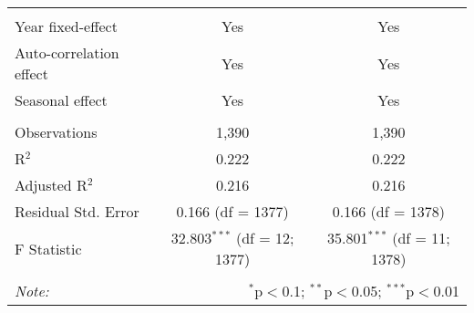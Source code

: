 \begin{table}[!htbp]
\begin{tabular}{@{\extracolsep{5pt}}lcc}
\hline \\[-1.8ex] 
Year fixed-effect & Yes & Yes \\ 
Auto-correlation effect & Yes & Yes \\ 
Seasonal effect & Yes & Yes \\ 
\hline \\[-1.8ex] 
Observations & 1,390 & 1,390 \\ 
R$^{2}$ & 0.222 & 0.222 \\ 
Adjusted R$^{2}$ & 0.216 & 0.216 \\ 
Residual Std. Error & 0.166 (df = 1377) & 0.166 (df = 1378) \\ 
F Statistic & 32.803$^{***}$ (df = 12; 1377) & 35.801$^{***}$ (df = 11; 1378) \\ 
\hline 
\hline \\[-1.8ex] 
\textit{Note:}  & \multicolumn{2}{r}{$^{*}$p$<$0.1; $^{**}$p$<$0.05; $^{***}$p$<$0.01} \\ 
\end{tabular} 
\end{table} 
